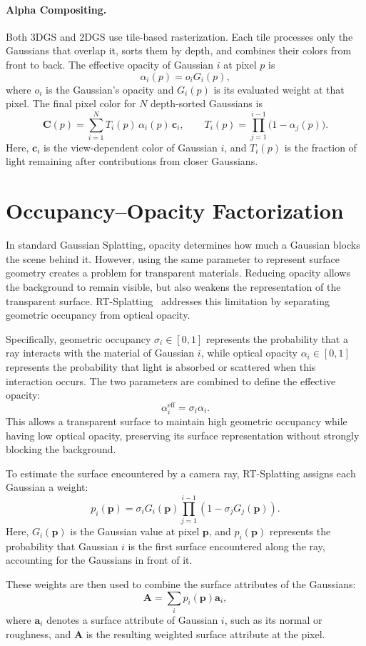 \paragraph{Alpha Compositing.}
Both 3DGS and 2DGS use tile-based rasterization. Each tile processes only the Gaussians that overlap it, sorts them by depth, and combines their colors from front to back. The effective opacity of Gaussian \(i\) at pixel \(p\) is
\[
  \alpha_i(p) = o_i G_i(p),
\]
where \(o_i\) is the Gaussian's opacity and \(G_i(p)\) is its evaluated weight at that pixel. The final pixel color for \(N\) depth-sorted Gaussians is
\[
  \mathbf{C}(p) = \sum_{i=1}^{N} T_i(p)\,\alpha_i(p)\,\mathbf{c}_i,
  \qquad
  T_i(p) = \prod_{j=1}^{i-1}\bigl(1-\alpha_j(p)\bigr).
\]
Here, \(\mathbf{c}_i\) is the view-dependent color of Gaussian \(i\), and \(T_i(p)\) is the fraction of light remaining after contributions from closer Gaussians.

\clearpage
\section{Occupancy--Opacity Factorization}

In standard Gaussian Splatting, opacity determines how much a Gaussian blocks the scene behind it. However, using the same parameter to represent surface geometry creates a problem for transparent materials. Reducing opacity allows the background to remain visible, but also weakens the representation of the transparent surface. RT-Splatting~\cite{shi2026} addresses this limitation by separating geometric occupancy from optical opacity.

Specifically, geometric occupancy \(\sigma_i \in [0,1]\) represents the probability that a ray interacts with the material of Gaussian \(i\), while optical opacity \(\alpha_i \in [0,1]\) represents the probability that light is absorbed or scattered when this interaction occurs. The two parameters are combined to define the effective opacity:
\[
  \alpha_i^{\mathrm{eff}} = \sigma_i \alpha_i.
\]
This allows a transparent surface to maintain high geometric occupancy while having low optical opacity, preserving its surface representation without strongly blocking the background.

To estimate the surface encountered by a camera ray, RT-Splatting assigns each Gaussian a weight:
\[
  p_i(\mathbf{p}) =
  \sigma_i G_i(\mathbf{p})
  \prod_{j=1}^{i-1}
  \left(1 - \sigma_j G_j(\mathbf{p})\right).
\]
Here, \(G_i(\mathbf{p})\) is the Gaussian value at pixel \(\mathbf{p}\), and \(p_i(\mathbf{p})\) represents the probability that Gaussian \(i\) is the first surface encountered along the ray, accounting for the Gaussians in front of it.

These weights are then used to combine the surface attributes of the Gaussians:
\[
  \mathbf{A} = \sum_i p_i(\mathbf{p}) \mathbf{a}_i,
\]
where \(\mathbf{a}_i\) denotes a surface attribute of Gaussian \(i\), such as its normal or roughness, and \(\mathbf{A}\) is the resulting weighted surface attribute at the pixel.
